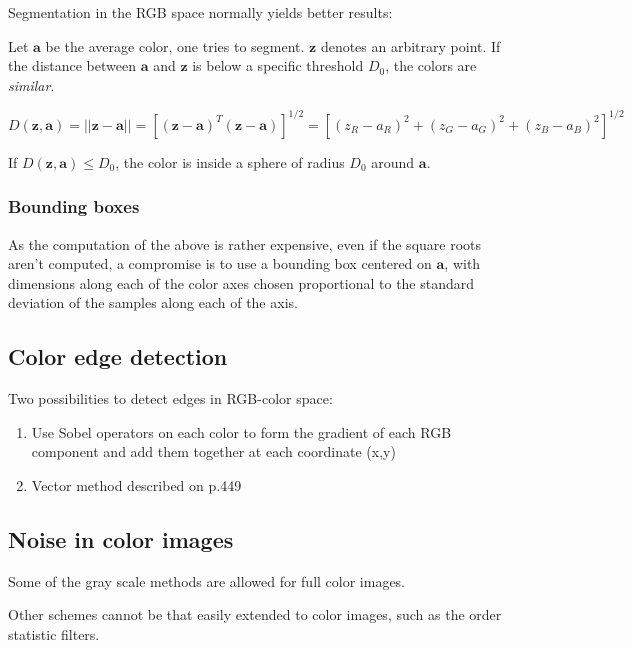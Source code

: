 Segmentation in the RGB space normally yields better results:

Let $\mathbf{a}$ be the average color, one tries to segment. $\mathbf{z}$ denotes an arbitrary point. If the distance between $\mathbf{a}$ and $\mathbf{z}$ is below a specific threshold $D_0$, the colors are \textit{similar}. 

\begin{equation}
	D(\mathbf{z},\mathbf{a}) = \left|\left| \mathbf{z}-\mathbf{a} \right|\right| = \left[(\mathbf{z}-\mathbf{a})^T(\mathbf{z}-\mathbf{a})\right]^{1/2} = \left[ (z_R-a_R)^2 + (z_G-a_G)^2 + (z_B-a_B)^2 \right]^{1/2}
\end{equation}

If $D(\mathbf{z},\mathbf{a}) \leq D_0$, the color is inside a sphere of radius $D_0$ around $\mathbf{a}$. 

\subsubsection{Bounding boxes }
As the computation of the above is rather expensive, even if the square roots aren't computed, a compromise is to use a bounding box centered on $\mathbf{a}$, with dimensions along each of the color axes chosen proportional to the standard deviation of the samples along each of the axis.

\subsection{Color edge detection }
Two possibilities to detect edges in RGB-color space:
\begin{enumerate}
	\item Use Sobel operators on each color to form the gradient of each RGB component and add them together at each coordinate (x,y)
	\item Vector method described on p.449
\end{enumerate}

\subsection{Noise in color images }
Some of the gray scale methods are allowed for full color images.

Other schemes cannot be that easily extended to color images, such as the order statistic filters.
